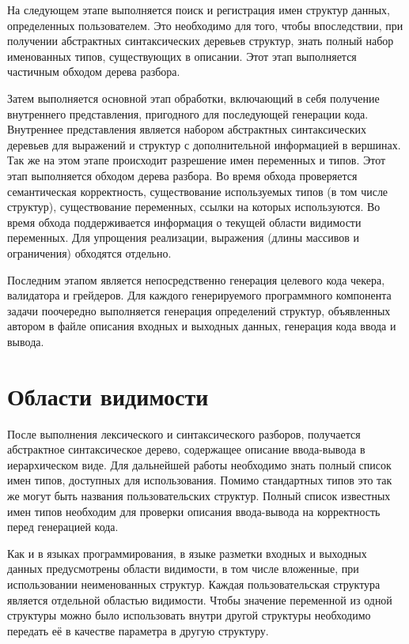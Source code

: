 \documentclass[times,specification,annotation]{style/itmo-student-thesis/itmo-student-thesis}
\begin{document}
На следующем этапе выполняется поиск и регистрация имен структур данных, определенных пользователем. Это необходимо для того, чтобы впоследствии, при получении абстрактных синтаксических деревьев структур, знать полный набор именованных типов, существующих в описании. Этот этап выполняется частичным обходом дерева разбора.

Затем выполняется основной этап обработки, включающий в себя получение внутреннего представления, пригодного для последующей генерации кода. Внутреннее представления является набором абстрактных синтаксических деревьев для выражений и структур с дополнительной информацией в вершинах. Так же на этом этапе происходит разрешение имен переменных и типов. Этот этап выполняется обходом дерева разбора. Во время обхода проверяется семантическая корректность, существование используемых типов (в том числе структур), существование переменных, ссылки на которых используются. Во время обхода поддерживается информация о текущей области видимости переменных. Для упрощения реализации, выражения (длины массивов и ограничения) обходятся отдельно.

Последним этапом является непосредственно генерация целевого кода чекера, валидатора и грейдеров. Для каждого генерируемого программного компонента задачи поочередно выполняется генерация определений структур, объявленных автором в файле описания входных и выходных данных, генерация кода ввода и вывода.

\section{Области видимости}

После выполнения лексического и синтаксического разборов, получается абстрактное синтаксическое дерево, содержащее описание ввода-вывода в иерархическом виде. Для дальнейшей работы необходимо знать полный список имен типов, доступных для использования. Помимо стандартных типов это так же могут быть названия пользовательских структур. Полный список известных имен типов необходим для проверки описания ввода-вывода на корректность перед генерацией кода.

Как и в языках программирования, в языке разметки входных и выходных данных предусмотрены области видимости, в том числе вложенные, при использовании неименованных структур. Каждая пользовательская структура является отдельной областью видимости. Чтобы значение переменной из одной структуры можно было использовать внутри другой структуры необходимо передать её в качестве параметра в другую структуру.
\end{document}

